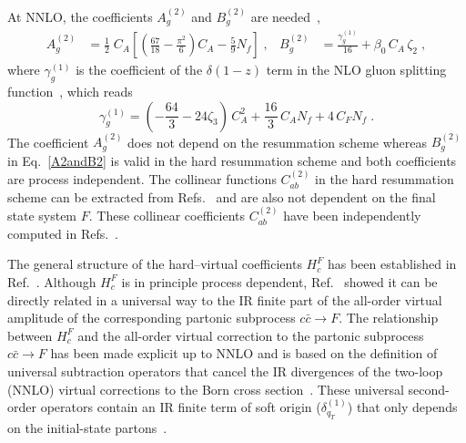 \documentclass[12pt]{article}
\DeclareRobustCommand{\qt}{\ensuremath{q_T}\xspace}
\begin{document}
\begin{appendix}
At NNLO, the coefficients $A^{(2)}_{g}$ and $B^{(2)}_{g}$ are needed~\cite{Bozzi:2005wk,Catani:2013tia,deFlorian:2001zd},
\begin{align}
  A^{(2)}_{g} &= 
  \frac{1}{2}\; C_A \left[ 
    \left( \frac{67}{18} - \frac{\pi^2}{6}\right) C_A 
    -\frac{5}{9} N_f 
  \right] \;, &
  B^{(2)}_{g} &=
  \frac{\gamma_{g}^{(1)}}{16}+\beta_0\, C_A\,\zeta_2 \;,
  \label{A2andB2}
\end{align}
where $\gamma_{g}^{(1)}$ is the coefficient of the $\delta(1-z)$ term in the NLO gluon splitting function~\cite{Curci:1980uw,Furmanski:1980cm}, which reads
\begin{equation}
  \gamma_{g}^{(1)} = 
  \left(-\frac{64}3-24\zeta_3\right)\,C_A^2
  +\frac{16}3\,C_A N_f
  +4\,C_F N_f\;.
  \label{ga1g}
\end{equation}
The coefficient $A^{(2)}_{g}$ does not depend on the resummation scheme whereas $B^{(2)}_{g}$  in Eq.~\eqref{A2andB2} is valid in the hard resummation scheme and both coefficients are process independent. The collinear functions $C^{(2)}_{ab}$ in the hard resummation scheme can be extracted from Refs.~\cite{Catani:2013tia,Catani:2011kr,Catani:2012qa} and are also not dependent on the final state system $F$. These collinear coefficients $C^{(2)}_{ab}$ have been independently computed in Refs.~\cite{Gehrmann:2012ze,Echevarria:2016scs}.

The general structure of the hard--virtual coefficients $H^{F}_{c}$ has been established in Ref.~\cite{Catani:2013tia}. Although $H^{F}_{c}$ is in principle process dependent, Ref.~\cite{Catani:2013tia} showed it can be directly related in a universal way to the IR finite part of the all-order virtual amplitude of the corresponding partonic subprocess $c{\bar c}\to F$. The relationship between $H^{F}_{c}$ and the all-order virtual correction to the  partonic subprocess $c{\bar c}\to F$ has been made explicit up to NNLO and is based on the definition of universal subtraction operators that cancel the IR divergences of the two-loop (NNLO) virtual corrections to the Born cross section~\cite{Catani:1998bh}. These universal second-order operators contain an IR finite term of soft origin ($\delta^{(1)}_{\qt}$) that only depends on the initial-state partons~\cite{Catani:2013tia}.


\end{appendix}
\end{document}

